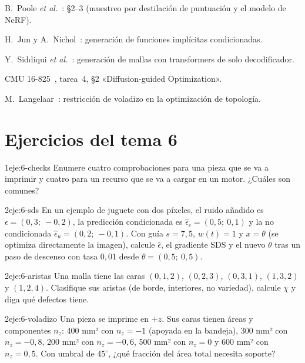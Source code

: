 \begin{lecturas}
\item B.~Poole \emph{et al.}~\cite{dreamfusion}: §2--3 (muestreo por destilación de puntuación y el modelo de NeRF).
\item H.~Jun y A.~Nichol~\cite{shape}: generación de funciones implícitas condicionadas.
\item Y.~Siddiqui \emph{et al.}~\cite{meshgpt}: generación de mallas con transformers de solo decodificador.
\item CMU 16-825~\cite{cmu16825}, tarea~4, §2 «Diffusion-guided Optimization».
\item M.~Langelaar~\cite{langelaar}: restricción de voladizo en la optimización de topología.
\end{lecturas}

\section*{Ejercicios del tema 6}

\begin{ejercicio}{1}{eje:6-checks}
Enumere cuatro comprobaciones para una pieza que se va a imprimir y cuatro para un recurso que se va a cargar en un motor. ¿Cuáles son comunes?
\end{ejercicio}

\begin{ejercicio}{2}{eje:6-sds}
En un ejemplo de juguete con dos píxeles, el ruido añadido es $\epsilon=(0{,}3;\ -0{,}2)$, la predicción condicionada es $\hat\epsilon_c=(0{,}5;\ 0{,}1)$ y la no condicionada $\hat\epsilon_u=(0{,}2;\ -0{,}1)$. Con guía $s=7{,}5$, $w(t)=1$ y $x=\theta$ (se optimiza directamente la imagen), calcule $\hat\epsilon$, el gradiente SDS y el nuevo $\theta$ tras un paso de descenso con tasa $0{,}01$ desde $\theta=(0{,}5;\ 0{,}5)$.
\end{ejercicio}

\begin{ejercicio}{2}{eje:6-aristas}
Una malla tiene las caras $(0,1,2)$, $(0,2,3)$, $(0,3,1)$, $(1,3,2)$ y $(1,2,4)$. Clasifique sus aristas (de borde, interiores, no variedad), calcule $\chi$ y diga qué defectos tiene.
\end{ejercicio}

\begin{ejercicio}{2}{eje:6-voladizo}
Una pieza se imprime en $+z$. Sus caras tienen áreas y componentes $n_z$: 400 mm² con $n_z=-1$ (apoyada en la bandeja), 300 mm² con $n_z=-0{,}8$, 200 mm² con $n_z=-0{,}6$, 500 mm² con $n_z=0$ y 600 mm² con $n_z=0{,}5$. Con umbral de $45^\circ$, ¿qué fracción del área total necesita soporte?
\end{ejercicio}

